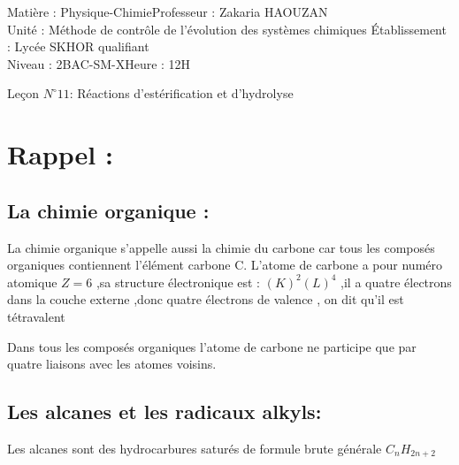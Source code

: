 \documentclass[12pt]{article}
\author{Zakaria HAOUZAN}
\date{\today}
\newcommand\headerMe[2]{\noindent{}#1\hfill#2}
\begin{document}
\headerMe{Matière : Physique-Chimie}{Professeur : Zakaria HAOUZAN}\\
\headerMe{Unité : Méthode de
contrôle de
l’évolution des
systèmes
chimiques }{Établissement : Lycée SKHOR qualifiant}\\
\headerMe{Niveau : 2BAC-SM-X}{Heure : 12H}\\

\begin{center}

  \Large{Leçon $N^{\circ} 11 $: \color{red} Réactions d'estérification et d'hydrolyse }
\end{center}






\section{Rappel : }
\subsection{La chimie organique :}
La chimie organique s'appelle aussi la chimie du carbone car tous les composés organiques contiennent l'élément carbone C.
L'atome de carbone a pour numéro atomique $Z=6$ ,sa structure électronique est : $(K)^2(L)^4$
,il a quatre électrons dans la couche externe ,donc quatre électrons de valence , on dit qu'il est tétravalent

Dans tous les composés organiques l'atome de carbone ne participe que par quatre liaisons avec les atomes voisins.

\subsection{Les alcanes et les radicaux alkyls: }
Les alcanes sont des hydrocarbures saturés de formule brute générale $C_nH_{2n+2}$
\end{document}
